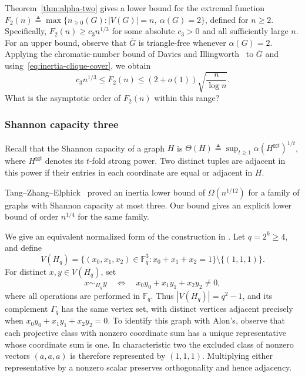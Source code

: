\documentclass[11pt]{article}
\numberwithin{equation}{section}
\theoremstyle{definition}
\theoremstyle{remark}
\begin{document}
Theorem~\ref{thm:alpha-two} gives a lower bound for the
extremal function
$F_2(n)\triangleq \max\{n_{\geq0}(G): |V(G)|=n,\ \alpha(G)=2\}$,
defined for $n\geq2$.
Specifically, $F_2(n)\geq c_3n^{1/3}$ for some absolute
$c_3>0$ and all sufficiently large $n$.
For an upper bound, observe that $\overline G$ is triangle-free
whenever $\alpha(G)=2$. Applying the chromatic-number bound of
Davies and Illingworth~\cite[Theorem~1.1]{DaviesIllingworth}
to $\overline G$ and using~\eqref{eq:inertia-clique-cover},
we obtain
\begin{equation}\label{eq:fixed-independence-range}
 c_3n^{1/3}\leq F_2(n)
 \leq(2+o(1))\sqrt{\frac{n}{\log n}}.
\end{equation}
What is the asymptotic order of $F_2(n)$ within this range?

\subsubsection{Shannon capacity three}\label{sec:capacity}

Recall that the Shannon capacity of a graph $H$ is
$\Theta(H)\triangleq \sup_{t\geq1}\alpha(H^{\boxtimes t})^{1/t}$,
where $H^{\boxtimes t}$ denotes its $t$-fold strong power.
Two distinct tuples are adjacent in this power if their
entries in each coordinate are equal or adjacent in $H$.

Tang--Zhang--Elphick~\cite[Theorem~1.8]{TZE} proved an inertia
lower bound of $\Omega(n^{1/12})$ for a family of graphs with
Shannon capacity at most three. Our bound gives an explicit lower
bound of order $n^{1/4}$ for the same family.

We give an equivalent normalized form of the construction in
\cite[proof of Theorem~3.2]{Alon2019}.
Let $q=2^k\geq4$, and define
\[
 V(H_q)=
 \{(x_0,x_1,x_2)\in\mathbb F_q^3:
   x_0+x_1+x_2=1\}\setminus\{(1,1,1)\}.
\]
For distinct $x,y\in V(H_q)$, set
\[
 x\sim_{H_q}y
 \quad\Longleftrightarrow\quad
 x_0y_0+x_1y_1+x_2y_2\ne0,
\]
where all operations are performed in $\mathbb F_q$.
Thus $|V(H_q)|=q^2-1$, and its complement $\Gamma_q$ has
the same vertex set, with distinct vertices adjacent precisely when
$x_0y_0+x_1y_1+x_2y_2=0$.
To identify this graph with Alon's, observe that each projective class with nonzero coordinate sum has a unique representative
whose coordinate sum is one. In characteristic two the excluded
class of nonzero vectors $(a,a,a)$ is therefore represented by
$(1,1,1)$. Multiplying either representative by a nonzero scalar
preserves orthogonality and hence adjacency.
\end{document}
